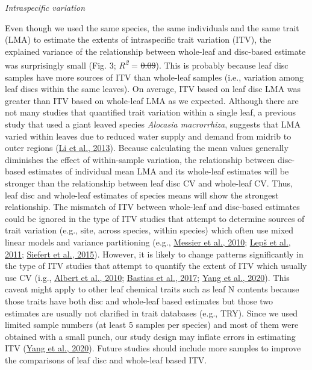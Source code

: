 \documentclass[
  12pt,
  a4paper,
,tablecaptionabove
]{scrartcl}
\providecommand{\DIFaddtex}[1]{{\protect\color{blue}\uwave{#1}}} %
\providecommand{\DIFdeltex}[1]{{\protect\color{red}\sout{#1}}}                      %
\providecommand{\DIFaddbegin}{} %
\providecommand{\DIFaddend}{} %
\providecommand{\DIFdelbegin}{} %
\providecommand{\DIFdelend}{} %
\providecommand{\DIFadd}[1]{\texorpdfstring{\DIFaddtex{#1}}{#1}} %
\providecommand{\DIFdel}[1]{\texorpdfstring{\DIFdeltex{#1}}{}} %
\begin{document}
\emph{Intraspecific variation}

Even though we used the same species, the same individuals and the same trait (LMA) to estimate the extents of intraspecific trait variation (ITV), the explained variance of the relationship between whole-leaf and disc-based estimate was surprisingly small (Fig. 3; \emph{R\textsuperscript{2}} = \DIFdelbegin \DIFdel{0.09}\DIFdelend \DIFaddbegin \DIFadd{0.08}\DIFaddend ).
This is probably because leaf disc samples have more sources of ITV than whole-leaf samples (i.e., variation among leaf discs within the same leaves).
On average, ITV based on leaf disc LMA was greater than ITV based on whole-leaf LMA as we expected.
Although there are not many studies that quantified trait variation within a single leaf, a previous study that used a giant leaved species \emph{Alocasia macrorrhiza}, suggests that LMA varied within leaves due to reduced water supply and demand from midrib to outer regions (\protect\hyperlink{ref-Li2013a}{Li et al., 2013}).
Because calculating the mean values generally diminishes the effect of within-sample variation, the relationship between disc-based estimates of individual mean LMA and its whole-leaf estimates will be stronger than the relationship between leaf disc CV and whole-leaf CV.
Thus, leaf disc and whole-leaf estimates of species means will show the strongest relationship.
The mismatch of ITV between whole-leaf and disc-based estimates could be ignored in the type of ITV studies that attempt to determine sources of trait variation (e.g., site, across species, within species) which often use mixed linear models and variance partitioning (e.g., \protect\hyperlink{ref-Messier2010}{Messier et al., 2010}; \protect\hyperlink{ref-Leps2011}{Lepš et al., 2011}; \protect\hyperlink{ref-Siefert2015}{Siefert et al., 2015}).
However, it is likely to change patterns significantly in the type of ITV studies that attempt to quantify the extent of ITV which usually use CV (i.g., \protect\hyperlink{ref-Albert2010a}{Albert et al., 2010}; \protect\hyperlink{ref-Bastias2017a}{Bastias et al., 2017}; \protect\hyperlink{ref-Yang2020}{Yang et al., 2020}).
This caveat might apply to other leaf chemical traits such as leaf N contents because those traits have both disc and whole-leaf based estimates but those two estimates are usually not clarified in trait databases (e.g., TRY).
Since we used limited sample numbers (at least 5 samples per species) and most of them were obtained with a small punch, our study design may inflate errors in estimating ITV (\protect\hyperlink{ref-Yang2020}{Yang et al., 2020}).
Future studies should include more samples to improve the comparisons of leaf disc and whole-leaf based ITV.
\end{document}

